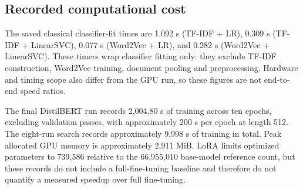 \subsection{Recorded computational cost}
The saved classical classifier-fit times are 1.092 s (TF-IDF + LR), 0.309 s
(TF-IDF + LinearSVC), 0.077 s (Word2Vec + LR), and 0.282 s (Word2Vec + LinearSVC).
These timers wrap classifier fitting only: they exclude TF-IDF construction,
Word2Vec training, document pooling and preprocessing. Hardware and timing scope
also differ from the GPU run, so these figures are not end-to-end speed ratios.

The final DistilBERT run records 2,004.80 s of training across ten epochs,
excluding validation passes, with approximately 200 s per epoch at length 512.
The eight-run search records approximately 9,998 s of training in total.
Peak allocated GPU memory is approximately 2,911 MiB. LoRA limits optimized
parameters to 739,586 relative to the 66,955,010 base-model reference count,
but these records do not include a full-fine-tuning baseline and therefore do
not quantify a measured speedup over full fine-tuning.
\FloatBarrier
